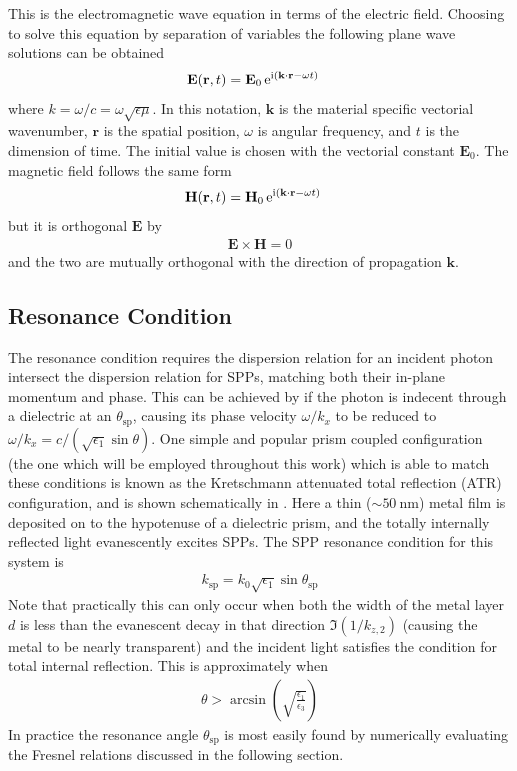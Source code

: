 \documentclass[a4paper,titlepage,onecolumn]{report}
\begin{document}
This is the electromagnetic wave equation in terms of the electric field.
Choosing to solve this equation by separation of variables the following
plane wave solutions can be obtained
\begin{align}
 \mathbf{E} ( \mathbf{r}, t ) &= \mathbf{E}_0\, {\mathrm{e}}^{{\mathrm{i}} (\mathbf{k} \cdot \mathbf{r} - \omega t )}
\label{eqn:planewaves}
\end{align}
where $k=\omega/c=\omega\sqrt{\epsilon\mu}$.  In this notation,
$\mathbf{k}$ is the material specific vectorial wavenumber, $\mathbf{r}$ is the
spatial position, $\omega$ is angular frequency, and $t$ is
the dimension of time.
The initial value is chosen with the vectorial constant $\mathbf{E}_0$.
The magnetic field follows the same form
\begin{align}
 \mathbf{H} ( \mathbf{r}, t ) &= \mathbf{H}_0\, {\mathrm{e}}^{{\mathrm{i}} (\mathbf{k}
 \cdot \mathbf{r} - \omega t )}
\end{align} 
but it is orthogonal $\mathbf{E}$ by
\begin{align}
\mathbf{E} \times \mathbf{H} = 0
\end{align}
and the two are mutually orthogonal with the direction of propagation
$\mathbf{k}$.

\subsection{Resonance Condition}
The resonance condition requires the dispersion relation for an
incident photon intersect the dispersion relation for SPPs, matching both
their in-plane momentum and phase.  This can be achieved by if the photon
is indecent through a dielectric at an $\theta_\text{sp}$, causing its phase
velocity $\omega/k_x$ to be reduced to  $\omega/k_x = c/(\sqrt{\epsilon_1}
\sin \theta)$.  One simple and popular prism coupled configuration (the one
which will be employed throughout this work) which is able to match these
conditions is known as the Kretschmann attenuated total reflection (ATR)
configuration, and is shown schematically in .
Here a thin ($\sim \SI{50}{\nano\meter}$) metal film is deposited on to the
hypotenuse of a dielectric prism, and the totally internally reflected
light evanescently excites SPPs.  The SPP resonance condition for this
system is
\begin{align}
k_\text{sp}=k_0 \sqrt{\epsilon_1} \sin \theta_\text{sp} 
\end{align}
Note that practically this can only occur when both the width of the metal
layer $d$ is less than the evanescent decay in that direction
$\Im(1/k_{z,2})$ (causing the metal to be nearly transparent) and the
incident light satisfies the condition for total internal reflection.  This 
is approximately when
\begin{align}
\theta>\arcsin\left(\sqrt{\frac{\epsilon_1}{\epsilon_3}}\right)
\end{align} 
In practice the resonance angle $\theta_\text{sp}$ is most easily found by
numerically evaluating the Fresnel relations discussed in the following
section.
\end{document}
